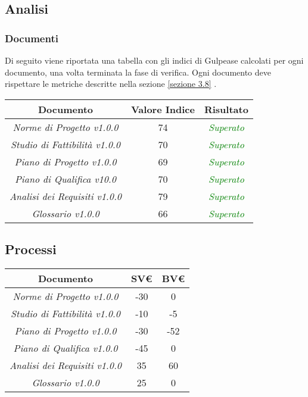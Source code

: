 \subsection{Analisi}
\subsubsection{Documenti}
\label{appendice 1}

Di seguito viene riportata una tabella con gli indici di \gls{Gulpease} calcolati per ogni documento, una volta terminata la fase di verifica. Ogni documento deve rispettare le metriche descritte nella sezione \ref{sezione 3.8} .\\

\hspace{1cm}

\begin{center}
	\begin{tabular}{|c|c|c|}
		\hline 
		\textbf{Documento} & \textbf{Valore Indice} & \textbf{Risultato} \\ 
		\hline
		\textit{Norme di Progetto v1.0.0} & 74 & \textcolor{green}{\textit{Superato}} \\ 
		\textit{Studio di Fattibilità v1.0.0} & 70 & \textcolor{green}{\textit{Superato}} \\ 
		\textit{Piano di Progetto v1.0.0} & 69 & \textcolor{green}{\textit{Superato}} \\ 
		\textit{Piano di Qualifica v10.0} & 70 & \textcolor{green}{\textit{Superato}} \\ 
		\textit{Analisi dei Requisiti v1.0.0} & 79 & \textcolor{green}{\textit{Superato}} \\ 
		\textit{Glossario v1.0.0} & 66 & \textcolor{green}{\textit{Superato}} \\ 
		\hline 
	\end{tabular}
\end{center}

\subsection{Processi}
\label{appendice 2}
\vspace{3mm}

\begin{center}
	\begin{tabular}{|c|c|c|}
		\toprule
			\textbf{Documento} & \textbf{SV€} & \textbf{BV€} \\ 
		\midrule
		\midrule
			\textit{Norme di Progetto v1.0.0} & -30 & 0 \\ 
			\textit{Studio di Fattibilità v1.0.0} & -10 & -5 \\ 
			\textit{Piano di Progetto v1.0.0} & -30 & -52 \\ 
			\textit{Piano di Qualifica v1.0.0} & -45 & 0 \\ 
			\textit{Analisi dei Requisiti v1.0.0} & 35 & 60 \\ 
			\textit{Glossario v1.0.0} & 25 & 0 \\ 
		\bottomrule
	\end{tabular}
\end{center}

